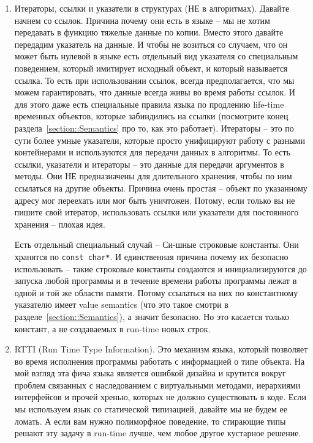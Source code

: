 \begin{enumerate}
\item Итераторы, ссылки и указатели в структурах (НЕ в алгоритмах).
Давайте начнем со ссылок.
Причина почему они есть в языке -- мы не хотим передавать в функцию тяжелые данные по копии.
Вместо этого давайте передадим указатель на данные.
И чтобы не возиться со случаем, что он может быть нулевой в языке есть отдельный вид указателя со специальным поведением, который имитирует исходный объект, и который называется ссылка.
То есть при использовании ссылок, всегда предполагается, что мы можем гарантировать, что данные всегда живы во время работы ссылок.
И для этого даже есть специальные правила языка по продлению life-time временных объектов, которые забиндились на ссылки (посмотрите конец раздела~\ref{section::Semantics} про то, как это работает).
Итераторы -- это по сути более умные указатели, которые просто унифицируют работу с разными контейнерами и используются для передачи данных в алгоритмы.
То есть ссылки, указатели и итераторы -- это данные для передачи аргументов в методы.
Они НЕ предназначены для длительного хранения, чтобы по ним ссылаться на другие объекты.
Причина очень простая -- объект по указанному адресу мог переехать или мог быть уничтожен.
Потому, если только вы не пишите свой итератор, использовать ссылки или указатели для постоянного хранения -- плохая идея.

Есть отдельный специальный случай -- Си-шные строковые константы.
Они хранятся по \verb"const char*".
И единственная причина почему их безопасно использовать -- такие строковые константы создаются и инициализируются до запуска любой программы и в течение времени работы программы лежат в одной и той же области памяти.
Потому ссылаться на них по константному указателю имеет value semantics (что это такое смотри в разделе~\ref{section::Semantics}), а значит безопасно.
Но это касается только констант, а не создаваемых в run-time новых строк.

\item RTTI (Run Time Type Information).
Это механизм языка, который позволяет во время исполнения программы работать с информацией о типе объекта.
На мой взгляд эта фича языка является ошибкой дизайна и крутится вокруг проблем связанных с наследованием с виртуальными методами, иерархиями интерфейсов и прочей хренью, которых не должно существовать в коде.
Если мы используем язык со статической типизацией, давайте мы не будем ее ломать.
А если вам нужно полиморфное поведение, то стирающие типы решают эту задачу в run-time лучше, чем любое другое кустарное решение.
\end{enumerate}
